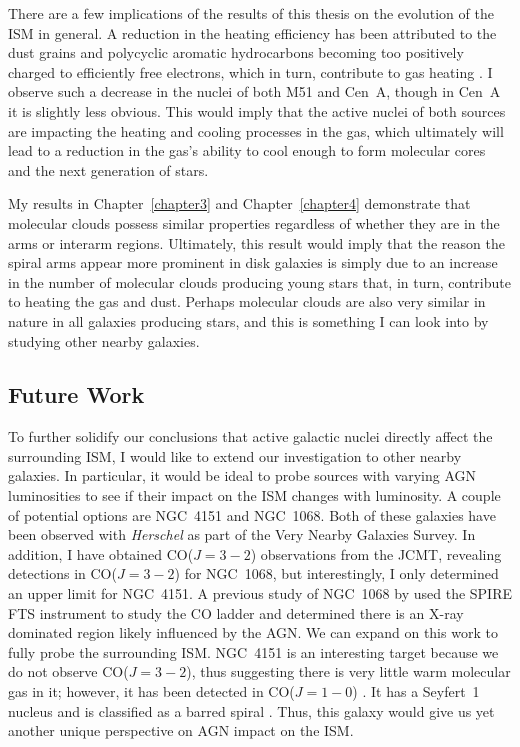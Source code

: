 There are a few implications of the results of this thesis on the evolution of the ISM in general.  A reduction in the heating efficiency has been attributed to the dust grains and polycyclic aromatic hydrocarbons becoming too positively charged to efficiently free electrons, which in turn, contribute to gas heating \citep{1985ApJ...291..722T,2012ApJ...747...81C,2012A&A...548A..91L}.  I observe such a decrease in the nuclei of both M51 and Cen~A, though in Cen~A it is slightly less obvious.  This would imply that the active nuclei of both sources are impacting the  heating and cooling processes in the gas, which ultimately will lead to a reduction in the gas's ability to cool enough to form molecular cores and the next generation of stars.

My results in Chapter~\ref{chapter3} and Chapter~\ref{chapter4} demonstrate that molecular clouds possess similar properties regardless of whether they are in the arms or interarm regions.  Ultimately, this result would imply that the reason the spiral arms appear more prominent in disk galaxies is simply due to an increase in the number of molecular clouds producing young stars that, in turn, contribute to heating the gas and dust.  Perhaps molecular clouds are also very similar in nature in all galaxies producing stars, and this is something I can look into by studying other nearby galaxies.

\subsection{Future Work}\label{future}
To further solidify our conclusions that active galactic nuclei directly affect the surrounding ISM, I would like to extend our investigation to other nearby galaxies.  In particular, it would be ideal to probe sources with varying AGN luminosities to see if their impact on the ISM changes with luminosity.  A couple of potential options are NGC~4151 and NGC~1068.  Both of these galaxies have been observed with \emph{Herschel} as part of the Very Nearby Galaxies Survey.  In addition, I have obtained CO($J=3-2$) observations from the JCMT, revealing detections in CO($J=3-2$) for NGC~1068, but interestingly, I only determined an upper limit for NGC~4151.  A previous study of NGC~1068 by \citet{2012ApJ...758..108S} used the SPIRE FTS instrument to study the CO ladder and determined there is an X-ray dominated region likely influenced by the AGN.  We can expand on this work to fully probe the surrounding ISM.  NGC~4151 is an interesting target because we do not observe CO($J=3-2$), thus suggesting there is very little warm molecular gas in it; however, it has been detected in CO($J=1-0$) \citep{2010ApJ...721..911D}.  It has a Seyfert~1 nucleus \citep{2000A&ARv..10..135U} and is classified as a barred spiral \citep{1991trcb.book.....D}.  Thus, this galaxy would give us yet another unique perspective on AGN impact on the ISM.

